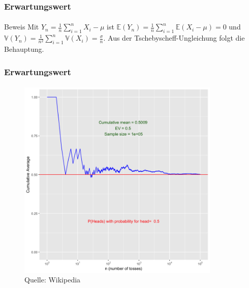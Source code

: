 \documentclass{beamer}
\begin{document}
\begin{frame}
    \frametitle{Erwartungswert}
\framesubtitle{}
\begin{block}{Beweis}
Mit $Y_n =  \frac{1}{n} \sum_{i=1}^{n}  X_i - \mu$ ist $\mathbb{E}(Y_n) =  \frac{1}{n} \sum_{i=1}^{n} \mathbb{E}( X_i - \mu) = 0$ und 
$\mathbb{V}(Y_n) =  \frac{1}{n^2} \sum_{i=1}^{n} \mathbb{V}( X_i ) = \frac{\sigma}{n}$. Aus der Tschebyscheff-Ungleichung folgt die Behauptung.
\end{block}
 \end{frame}


\begin{frame}
    \frametitle{Erwartungswert}
\framesubtitle{}

\begin{figure}[htp]
      \centering
    \includegraphics[width=0.86\textwidth]{img/sgdz}
      \caption{Quelle: Wikipedia}
\end{figure}
 \end{frame}
\end{document}
